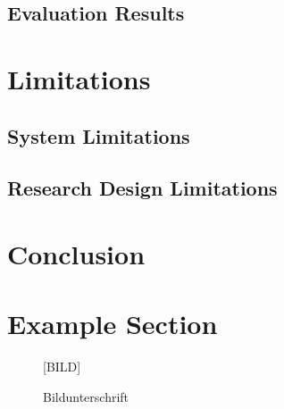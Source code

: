\documentclass[11pt,a4paper,twoside]{article}
\begin{document}
\subsection{Evaluation Results} \label{EvalResults}


\cleardoublepage

\section{Limitations}

\subsection{System Limitations}

\subsection{Research Design Limitations}


\cleardoublepage

\section{Conclusion}


\cleardoublepage %
\section{Example Section}

\begin{figure}%


  \begin{center}\LARGE [BILD]\end{center}
  \caption{Bildunterschrift}
  \label{fig:beispielbild}
\end{figure}
\end{document}
